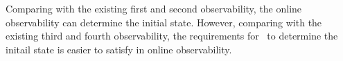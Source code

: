 Comparing with the existing first and second observability, the online observability can determine the initial state. However, comparing with the existing third and fourth observability, the requirements for \BCNs\ to determine the initail state is easier to satisfy in online observability.  %
